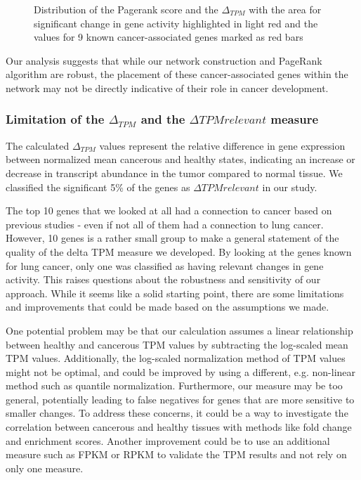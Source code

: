 \begin{figure}[h]
    \endminipage
    \caption{Distribution of the Pagerank score and the $\Delta_{TPM}$
        with the area for significant change in gene activity highlighted in light red
        and the values for 9 known cancer-associated genes marked as red bars}
    \label{fig:05_known_genes}
\end{figure}

Our analysis suggests that while our network construction and PageRank algorithm are robust,
the placement of these cancer-associated genes within the network may not be directly indicative
of their role in cancer development.\\

\subsubsection*{Limitation of the $\Delta_{TPM}$ and the $\Delta TPM relevant$ measure} \label{subsubsec:limit_delta_tpm}
The calculated $\Delta_{TPM}$ values represent the relative difference in gene expression between normalized mean cancerous and healthy states,
indicating an increase or decrease in transcript abundance in the tumor compared to normal tissue.
We classified the significant 5\% of the genes as $\Delta TPM relevant$ in our study.

The top 10 genes that we looked at all had a connection to cancer based on previous studies
- even if not all of them had a connection to lung cancer.
However, 10 genes is a rather small group to make a general statement of the quality of the delta TPM measure we developed.
By looking at the genes known for lung cancer, only one was classified as having relevant changes in gene activity.
This raises questions about the robustness and sensitivity of our approach.
While it seems like a solid starting point, there are some limitations and improvements that could be made based on the assumptions we made.

One potential problem may be that our calculation assumes a linear relationship between healthy and cancerous TPM values
by subtracting the log-scaled mean TPM values.
Additionally, the log-scaled normalization method of TPM values might not be optimal,
and could be improved by using a different, e.g. non-linear method such as quantile normalization.
Furthermore, our measure may be too general, potentially leading to false negatives for genes that are more sensitive to smaller changes.
To address these concerns, it could be a way to investigate the correlation between cancerous and healthy tissues
with methods like fold change and enrichment scores.
Another improvement could be to use an additional measure such as FPKM or RPKM to validate the TPM results and not rely on only one measure.
\\

